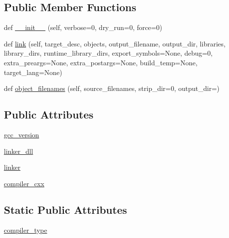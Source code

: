 \subsection*{Public Member Functions}
\begin{DoxyCompactItemize}
\item 
def \hyperlink{classnumpy_1_1distutils_1_1mingw32ccompiler_1_1Mingw32CCompiler_a0a5032cfd6908a96fbb5c0bb4f72140a}{\+\_\+\+\_\+init\+\_\+\+\_\+} (self, verbose=0, dry\+\_\+run=0, force=0)
\item 
def \hyperlink{classnumpy_1_1distutils_1_1mingw32ccompiler_1_1Mingw32CCompiler_adc7de0fe90ef216265190007bec38cde}{link} (self, target\+\_\+desc, objects, output\+\_\+filename, output\+\_\+dir, libraries, library\+\_\+dirs, runtime\+\_\+library\+\_\+dirs, export\+\_\+symbols=None, debug=0, extra\+\_\+preargs=None, extra\+\_\+postargs=None, build\+\_\+temp=None, target\+\_\+lang=None)
\item 
def \hyperlink{classnumpy_1_1distutils_1_1mingw32ccompiler_1_1Mingw32CCompiler_a585fb70fc54fd442bb0e5475ee75ae75}{object\+\_\+filenames} (self, source\+\_\+filenames, strip\+\_\+dir=0, output\+\_\+dir=\textquotesingle{}\textquotesingle{})
\end{DoxyCompactItemize}
\subsection*{Public Attributes}
\begin{DoxyCompactItemize}
\item 
\hyperlink{classnumpy_1_1distutils_1_1mingw32ccompiler_1_1Mingw32CCompiler_ad9a10382b536f37313e8e475577bdeba}{gcc\+\_\+version}
\item 
\hyperlink{classnumpy_1_1distutils_1_1mingw32ccompiler_1_1Mingw32CCompiler_a45cdef03085be2e47ce3a4af33f969fd}{linker\+\_\+dll}
\item 
\hyperlink{classnumpy_1_1distutils_1_1mingw32ccompiler_1_1Mingw32CCompiler_a66bd6b4f14fd6673e22cd0bb16e51bed}{linker}
\item 
\hyperlink{classnumpy_1_1distutils_1_1mingw32ccompiler_1_1Mingw32CCompiler_a2488a2e767f9985a487a6c3eccf09bc3}{compiler\+\_\+cxx}
\end{DoxyCompactItemize}
\subsection*{Static Public Attributes}
\begin{DoxyCompactItemize}
\item 
\hyperlink{classnumpy_1_1distutils_1_1mingw32ccompiler_1_1Mingw32CCompiler_a14b135962a5bf0af5ea2d4c09cc291ce}{compiler\+\_\+type}
\end{DoxyCompactItemize}


